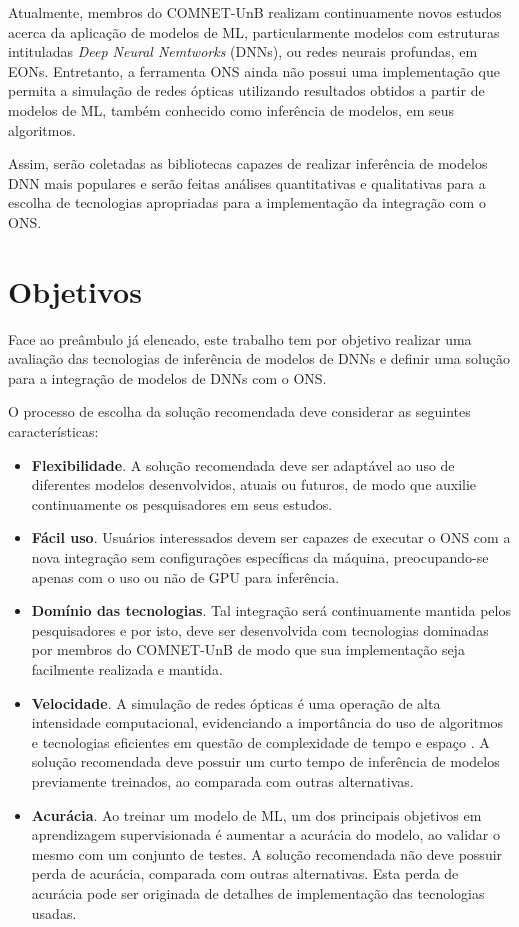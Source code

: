 Atualmente, membros do COMNET-UnB realizam continuamente novos estudos acerca da aplicação de modelos de ML, particularmente modelos com estruturas intituladas \textit{Deep Neural Nemtworks} (DNNs), ou redes neurais profundas, em EONs. Entretanto, a ferramenta ONS ainda não possui uma implementação que permita a simulação de redes ópticas utilizando resultados obtidos a partir de modelos de ML, também conhecido como inferência de modelos, em seus algoritmos.

Assim, serão coletadas as bibliotecas capazes de realizar inferência de modelos DNN mais populares e serão feitas análises quantitativas e qualitativas para a escolha de tecnologias apropriadas para a implementação da integração com o ONS.

\section{Objetivos}
\label{intro-goals}

Face ao preâmbulo já elencado, este trabalho tem por objetivo realizar uma avaliação das tecnologias de inferência de modelos de DNNs e definir uma solução para a integração de modelos de DNNs com o ONS.

O processo de escolha da solução recomendada deve considerar as seguintes características:

\begin{itemize}
  \item \textbf{Flexibilidade}. A solução recomendada deve ser adaptável ao uso de diferentes modelos desenvolvidos, atuais ou futuros, de modo que auxilie continuamente os pesquisadores em seus estudos.
  \item \textbf{Fácil uso}. Usuários interessados devem ser capazes de executar o ONS com a nova integração sem configurações específicas da máquina, preocupando-se apenas com o uso ou não de GPU para inferência.
  \item \textbf{Domínio das tecnologias}. Tal integração será continuamente mantida pelos pesquisadores e por isto, deve ser desenvolvida com tecnologias dominadas por membros do COMNET-UnB de modo que sua implementação seja facilmente realizada e mantida.
  \item \textbf{Velocidade}. A simulação de redes ópticas é uma operação de alta intensidade computacional, evidenciando a importância do uso de algoritmos e tecnologias eficientes em questão de complexidade de tempo e espaço \cite{chehab_2019}. A solução recomendada deve possuir um curto tempo de inferência de modelos previamente treinados, ao comparada com outras alternativas.
  \item \textbf{Acurácia}. Ao treinar um modelo de ML, um dos principais objetivos em aprendizagem supervisionada é aumentar a acurácia do modelo, ao validar o mesmo com um conjunto de testes. A solução recomendada não deve possuir perda de acurácia, comparada com outras alternativas. Esta perda de acurácia pode ser originada de detalhes de implementação das tecnologias usadas.
\end{itemize}

